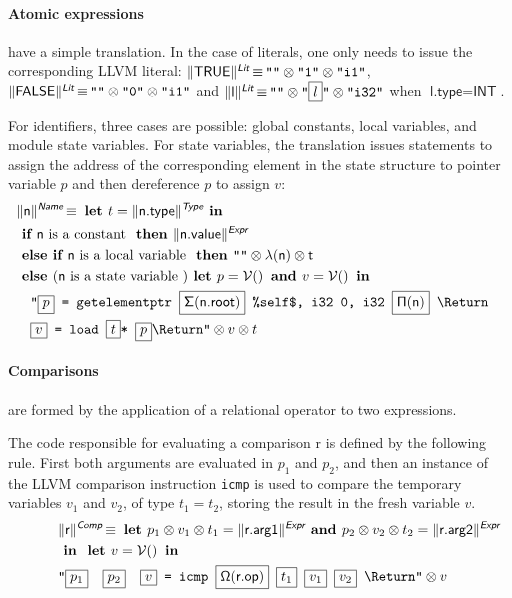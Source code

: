 \documentclass{llncs}
\newcommand{\trad}[2]{\ensuremath{\lVert \textsf{#1} \rVert^{\textit{#2}}}}
\newcommand{\nl}[0]{\text{\Return}}
\DeclareMathOperator{\isdef}{\equiv}
\DeclareMathOperator{\variable}{\mathcal{V}()}
\newcommand{\llvm}[1]{\texttt{#1}}
\newcommand{\B}[1]{\textsf{#1}}
\newcommand{\IF}[0]{\textbf{ if }}
\newcommand{\ELSIF}[0]{\textbf{ else if }}
\newcommand{\ELSE}[0]{\textbf{ else }}
\newcommand{\THEN}[0]{\textbf{ then }}
\newcommand{\LET}[0]{\textbf{ let }}
\newcommand{\IN}[0]{\textbf{ in }}
\newcommand{\AND}[0]{\textbf{ and }}
\newcommand{\PH}[1]{\framebox{$#1$}}
\newcommand{\sep}[0]{\otimes}
\newcommand{\local}[0]{\ensuremath{\sf\lambda}}
\newcommand{\opmap}[0]{\ensuremath{\sf\Omega}}
\newcommand{\idx}[0]{\ensuremath{\sf\Pi}}
\newcommand{\state}[0]{\ensuremath{\sf\Sigma}}
\begin{document}
\paragraph{Atomic expressions} have a simple translation. In the case of
literals, one only needs to issue the corresponding LLVM literal:
$\trad{TRUE}{\B{Lit}} \isdef \llvm{""} \sep \llvm{"1"} \sep \llvm{"i1"}$,
$\trad{FALSE}{\B{Lit}} \isdef \llvm{""} \sep \llvm{"0"} \sep \llvm{"i1"}$ and
$\trad{l}{\B{Lit}} \isdef \llvm{""} \sep \llvm{"\PH{l}"} \sep \llvm{"i32"}$ when
$\B{l.type} = \B{INT}$.

For identifiers, three cases are possible: global constants, local variables,
and module state variables. For state variables, the translation issues
statements to assign the address of the corresponding element in the state
structure to pointer variable $p$ and then dereference $p$ to assign $v$:
\begin{align*}
\lefteqn{\trad{n}{\B{Name}} \isdef \LET t = \trad{n.type}{\B{Type}} \IN} \\
& \IF \B{n} \mbox{ is a constant } \THEN \trad{n.value}{\B{Expr}} \\
& \ELSIF \B{n} \mbox{ is a local variable } \THEN 
\llvm{""} \sep \local(\B{n}) \sep t \\
& \ELSE (\B{n} \mbox{ is a state variable }) \LET p = \variable \AND v = \variable \IN \\
& \quad \llvm{"\PH{p} = getelementptr \PH{\state(\B{n.root})} \%self\$, i32 0, i32 \PH{\idx(\B{n})} \nl} \\
& \quad \llvm{\PH{v} = load \PH{t}* \PH{p}\nl"} \sep v \sep t
\end{align*}

\paragraph{Comparisons} are formed by the application of a relational operator
to two expressions. 

The code responsible for evaluating a comparison \B{r} is defined by the
following rule. First both arguments are evaluated in $p_1$ and $p_2$, and then
an instance of the LLVM comparison instruction \llvm{icmp} is used to compare
the temporary variables $v_1$ and $v_2$, of type $t_1 = t_2$, storing the result
in the fresh variable $v$.
\begin{align*}
\lefteqn{\trad{r}{\B{Comp}} \isdef
  \LET
  p_1 \sep v_1 \sep t_1 = \trad{r.arg1}{\B{Expr}} \AND
  p_2 \sep v_2 \sep t_2 = \trad{r.arg2}{\B{Expr}}} \\
& \IN \LET v = \variable \IN \\
& \llvm{"\PH{p_1}\quad\PH{p_2}\quad\PH{v} = icmp \PH{\opmap(\B{r.op})} \PH{t_1} \PH{v_1} \PH{v_2} \nl"} \sep v
\end{align*}
   
\end{document}

